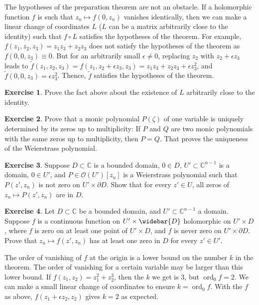 \documentclass[12pt,openany]{book}
\newcommand{\ord}{\operatorname{ord}}
\newcommand{\C}{{\mathbb{C}}}
\newcommand{\sO}{{\mathscr{O}}}
\theoremstyle{plain}
\theoremstyle{remark}
\theoremstyle{definition}
\newenvironment{exbox}{%
    \def\FrameCommand{\vrule width 1pt \relax\hspace{10pt}}%
    \MakeFramed{\advance\hsize-\width\FrameRestore}%
}{%
    \endMakeFramed
}
\theoremstyle{exercise}
\newtheorem{exercise}{Exercise}[section]
\theoremstyle{example}
\begin{document}
The hypotheses of the preparation theorem are not an obstacle.  If a holomorphic
function $f$ is such that $z_n \mapsto f(0,z_n)$ vanishes identically,
then we can make a linear change of
coordinates $L$ ($L$ can be a matrix arbitrarily close to the identity) such
that $f \circ L$ satisfies the hypotheses of the theorem.
For example, $f(z_1,z_2,z_3) = z_1z_3+z_2z_3$ does not satisfy the
hypotheses of the theorem as $f(0,0,z_3) \equiv 0$.  But for an arbitrarily
small $\epsilon \neq 0$, replacing
$z_2$ with $z_2 + \epsilon z_3$ leads to $\tilde{f}(z_1,z_2,z_3)
= f(z_1,z_2+\epsilon z_3,z_3) =
z_1z_3+z_2z_3 + \epsilon z_3^2$, and $\tilde{f}(0,0,z_3) = \epsilon z_3^2$.
Thence, $\tilde{f}$
satisfies the hypotheses of the theorem.

\begin{exbox}
\begin{exercise}
Prove the fact above about the existence of $L$ arbitrarily close to the
identity.
\end{exercise}

\begin{exercise} \label{exercise:monicpolyunique}
Prove that a monic polynomial $P(\zeta)$ of one variable is
uniquely determined by its zeros up to multiplicity:
If $P$ and $Q$ are two monic polynomials with the same zeros
up to multiplicity,
then $P=Q$.  That proves the uniqueness of the Weierstrass polynomial.
\end{exercise}

\begin{exercise}
Suppose $D \subset \C$ is a bounded domain, $0 \in D$,
$U' \subset \C^{n-1}$ is a domain, $0 \in U'$,
and $P \in \sO(U')[z_n]$ is a Weierstrass polynomial
such that $P(z',z_n)$ is not zero on $U' \times \partial D$.
Show that for every $z' \in U$, all zeros of $z_n \mapsto P(z',z_n)$ are in $D$.
\end{exercise}

\begin{exercise}
Let $D \subset \C$ be a bounded domain,
and
$U' \subset \C^{n-1}$ a domain.
Suppose
$f$ is a continuous function on
$U' \times \widebar{D}$ holomorphic on $U' \times D$,
where $f$ is zero on at least one point
of $U' \times D$, and $f$ is never zero on
$U' \times \partial D$.
Prove that
$z_n \mapsto f(z',z_n)$ has at least one zero in $D$ for every $z' \in U'$.
\end{exercise}
\end{exbox}

\pagebreak[2]
The order of vanishing of $f$ at the origin is a lower bound
on the number $k$ in the theorem.  The order of vanishing for a certain
variable may be larger than this lower bound.  If $f(z_1,z_2) =
z_1^2 + z_2^3$, then the $k$ we get is $3$, but $\ord_0 f = 2$.
We can make a small
linear change of coordinates to ensure $k = \ord_0 f$.
With the $f$ as above, $f(z_1 + \epsilon z_2,z_2)$ gives $k = 2$
as expected.
\end{document}
